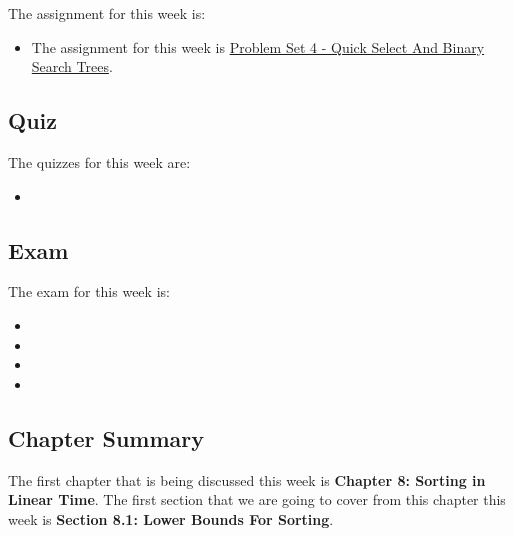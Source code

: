 The assignment for this week is:

\begin{itemize}
    \item The assignment for this week is \href{https://github.com/QuantumCompiler/CU/tree/main/CSPB%203104%20-%20Algorithms/CSPB%203104%20-%20Assignments/CSPB%203104%20-%20Problem%20Sets/CSPB%203104%20-%20Problem%20Set%204%20-%20Quick%20Select%20And%20Binary%20Search%20Trees}{Problem Set 4 - Quick Select And Binary Search Trees}. 
\end{itemize}

\subsection{Quiz}

The quizzes for this week are:

\begin{itemize}
    \item {} \textbullet {} 
\end{itemize}

\subsection{Exam}

The exam for this week is:

\begin{itemize}
    \item {}
    \item {}
    \item {} 
    \item {}
\end{itemize}

\subsection{Chapter Summary}

The first chapter that is being discussed this week is \textbf{Chapter 8: Sorting in Linear Time}. The first section that we are going to cover from this chapter this week is \textbf{Section 8.1: Lower Bounds For Sorting}.

